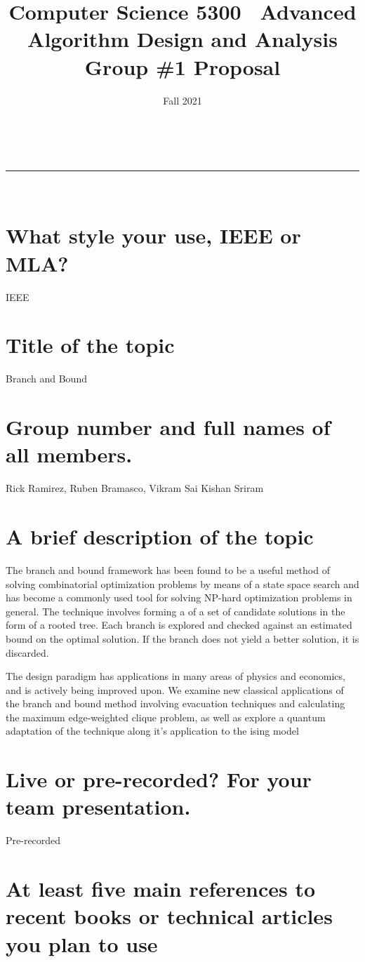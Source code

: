 \documentclass[11pt]{article}
\title{Computer Science 5300
\partition\
    Advanced Algorithm Design and Analysis\\
    \vspace{1ex}
    Group \#1 Proposal}
\author{\small }
\date{Fall 2021}
\makeatletter
\newcommand{\partition}{\rule{\linewidth}{0.8pt}}
\renewcommand{\maketitle}{
    \begin{center}
        \@date \hfill  \@author\\
        {\Large \textsc{\@title}}
        \partition\\
    \end{center}
}
\makeatother
\begin{document}
	\vspace*{-3cm}
	{\let\newpage\relax\maketitle}
	    
    \section{\normalsize What style your use, IEEE or MLA?}
        IEEE
    \section{\normalsize Title of the topic}
        Branch and Bound
    \section{\normalsize Group number and full names of all members.}
        Rick Ramirez, Ruben Bramasco, Vikram Sai Kishan Sriram
    \section{\normalsize A brief description of the topic}
    	The branch and bound framework has been found to be a useful method of solving combinatorial optimization problems by means of a state space search and has become a commonly used tool for solving NP-hard optimization problems in general. The technique involves forming a of a set of candidate solutions in the form of a rooted tree. Each branch is explored and checked against an estimated bound on the optimal solution. If the branch does not yield a better solution, it is discarded. 
    	
    	The design paradigm has applications in many areas of physics and economics, and is actively being improved upon. We examine new classical applications of the branch and bound method involving evacuation techniques and calculating the maximum edge-weighted clique problem, as well as explore a quantum adaptation of the technique along it's application to the ising model
    \section{\normalsize Live or pre-recorded? For your team presentation.}
        Pre-recorded
    \section{\normalsize At least five main references to recent books or technical articles you plan to use}

    \nocite{montanaro2020quantum, baccari2020verifying, san2019new, goerigk2013branch, cormen2009introduction}
    
    
\end{document}
